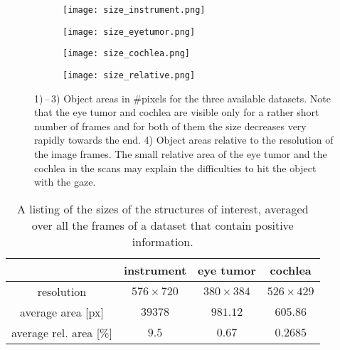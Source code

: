 \begin{figure}[ht]
	\centering
	\begin{subfigure}[h]{\textwidth}
	  \texttt{[image: size\_instrument.png]}
	\end{subfigure}
	
	\vspace{5mm}
	\begin{subfigure}[h]{\textwidth}
	  \texttt{[image: size\_eyetumor.png]}
	\end{subfigure}
	
	\vspace{5mm}
	\begin{subfigure}[h]{\textwidth}
	  \texttt{[image: size\_cochlea.png]}
	\end{subfigure}
	
	\vspace{5mm}
	\begin{subfigure}[h]{\textwidth}
	  \texttt{[image: size\_relative.png]}
	\end{subfigure}	
	\caption{1)\,--\,3) Object areas in \#pixels for the three available datasets. Note that the eye tumor and cochlea are visible only for a rather short number of frames and for both of them the size decreases very rapidly towards the end. 4) Object areas relative to the resolution of the image frames. The small relative area of the eye tumor and the cochlea in the scans may explain the difficulties to hit the object with the gaze.}
	\label{fig:objectsizeplot}
\end{figure}


\begin{table}[ht]
	\centering
	\begin{tabular}{ | c || c | c | c | }
	\hline
				& instrument 	& eye tumor & cochlea \\ \hline \hline
	  resolution  		& $576 \times 720$ & $380 \times 384$ & $526 \times 429$ \\ 
	  average area [px]	& $39378$ 	& $981.12$ 	 & $605.86$ \\
	  average rel. area [\%]& $9.5$ 		& $0.67$ 		 & $0.2685$ \\ \hline
	\end{tabular}
		\caption{A listing of the sizes of the structures of interest, averaged over all the frames of a dataset that contain positive information.}
		\label{tab:avgobjectsize}
\end{table}


